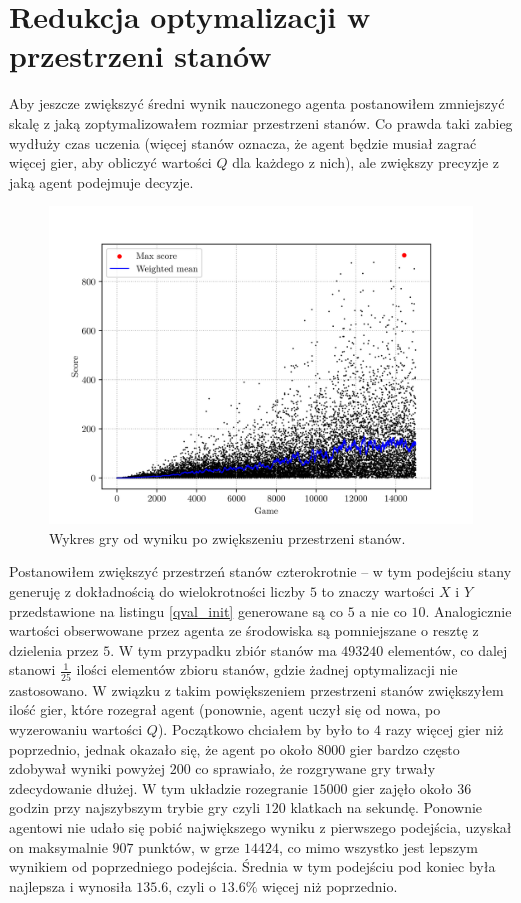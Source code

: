 \documentclass[a4paper, 12pt,oneside]{book}
\begin{document}
\section{Redukcja optymalizacji w przestrzeni stanów}
Aby jeszcze zwiększyć średni wynik nauczonego agenta postanowiłem zmniejszyć
skalę z jaką zoptymalizowałem rozmiar przestrzeni stanów. Co prawda taki zabieg
wydłuży czas uczenia (więcej stanów oznacza, że agent będzie musiał zagrać
więcej gier, aby obliczyć wartości $Q$ dla każdego z nich), ale zwiększy
precyzje z jaką agent podejmuje decyzje.
\begin{figure}[!htb]
	\begin{center}
		\includegraphics{plotGrid5x5TopPipePenalty.png}
	\end{center}
	\caption{Wykres gry od wyniku po zwiększeniu przestrzeni stanów.}
	\label{plot_gird_5x5}
\end{figure}

Postanowiłem zwiększyć przestrzeń stanów czterokrotnie -- w tym podejściu stany
generuję z dokładnością do wielokrotności liczby $5$ to znaczy wartości $X$ i
$Y$ przedstawione na listingu \ref{qval_init} generowane są co $5$ a nie co
$10$. Analogicznie wartości obserwowane przez agenta ze środowiska są
pomniejszane o resztę z dzielenia przez $5$. W tym przypadku zbiór stanów ma
$493 240$ elementów, co dalej stanowi $\frac{1}{25}$ ilości elementów
zbioru stanów, gdzie żadnej optymalizacji nie zastosowano. W związku z takim
powiększeniem przestrzeni stanów zwiększyłem ilość gier, które rozegrał agent
(ponownie, agent uczył się od nowa, po wyzerowaniu wartości $Q$). Początkowo
chciałem by było to $4$ razy więcej gier niż poprzednio, jednak okazało się,
że agent po około $8000$ gier bardzo często zdobywał wyniki powyżej $200$ co
sprawiało, że rozgrywane gry trwały zdecydowanie dłużej. W tym układzie
rozegranie $15000$ gier zajęło około $36$ godzin przy najszybszym trybie gry
czyli $120$ klatkach na sekundę. Ponownie agentowi nie udało się pobić
największego wyniku z pierwszego podejścia, uzyskał on maksymalnie $907$
punktów, w grze $14424$, co mimo wszystko jest lepszym wynikiem od poprzedniego
podejścia. Średnia w tym podejściu pod koniec była najlepsza i wynosiła
$135.6$, czyli o $13.6\%$ więcej niż poprzednio.
\end{document}
